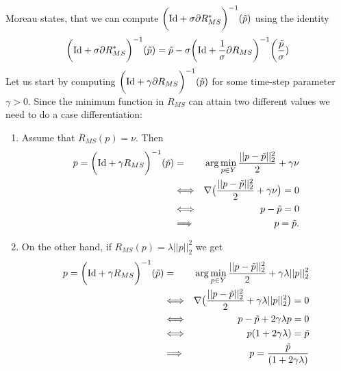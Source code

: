         Moreau states, that we can compute $\bigg( \textnormal{Id} + \sigma \partial R_{MS}^{\ast} \bigg)^{-1}(\tilde{p})$ using the identity
            \begin{equation}
                \bigg( \textnormal{Id} + \sigma \partial R_{MS}^{\ast} \bigg)^{-1}(\tilde{p}) = \tilde{p} - \sigma \bigg( \textnormal{Id} + \frac{1}{\sigma} \partial R_{MS} \bigg)^{-1} \bigg(\frac{\tilde{p}}{\sigma}) \bigg.
            \label{eq:moreau_mumford_shah_regularizer}
            \end{equation}
        Let us start by computing $\bigg( \textnormal{Id} + \gamma\partial R_{MS} \bigg)^{-1}(\tilde{p})$ for some time-step parameter $\gamma > 0$. Since the minimum function in $R_{MS}$ can attain two different values we need to do a case differentiation:
        \begin{enumerate}
            \item Assume that $R_{MS}(p) = \nu$. Then
                \begin{eqnarray}
                    p = \bigg( \textnormal{Id} + \gamma R_{MS} \bigg)^{-1}(\tilde{p}) &=& \arg \min_{p \in Y} \frac{||p - \tilde{p}||_{2}^{2}}{2} + \gamma\nu \notag \\
                    &\Longleftrightarrow& \nabla \big( \frac{||p - \tilde{p}||_{2}^{2}}{2} + \gamma\nu \big) = 0 \notag \\
                    &\Longleftrightarrow& p - \tilde{p} = 0 \notag \\
                    &\Longrightarrow& p = \tilde{p}. \notag
                \end{eqnarray}
            \item On the other hand, if $R_{MS}(p) = \lambda ||p||_{2}^{2}$ we get
                \begin{eqnarray}
                    p = \bigg( \textnormal{Id} + \gamma R_{MS} \bigg)^{-1}(\tilde{p}) &=& \arg \min_{p \in Y} \frac{||p - \tilde{p}||_{2}^{2}}{2} + \gamma \lambda ||p||_{2}^{2} \notag \\
                    &\Longleftrightarrow& \nabla \big( \frac{||p - \tilde{p}||_{2}^{2}}{2} + \gamma \lambda ||p||_{2}^{2} \big) = 0 \notag \\
                    &\Longleftrightarrow& p - \tilde{p} + 2 \gamma \lambda p = 0 \notag \\
                    &\Longleftrightarrow& p (1 + 2\gamma \lambda) = \tilde{p} \notag \\
                    &\Longrightarrow& p = \frac{\tilde{p}}{(1 + 2\gamma \lambda)} \notag
                \end{eqnarray}
        \end{enumerate}

